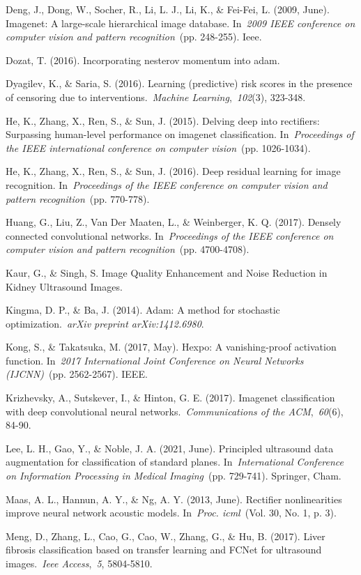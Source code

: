 \documentclass[
]{article}
\begin{document}
Deng, J., Dong, W., Socher, R., Li, L. J., Li, K., \& Fei-Fei, L. (2009,
June). Imagenet: A large-scale hierarchical image database.
In~\emph{2009 IEEE conference on computer vision and pattern
recognition}~(pp. 248-255). Ieee.

Dozat, T. (2016). Incorporating nesterov momentum into adam.

Dyagilev, K., \& Saria, S. (2016). Learning (predictive) risk scores in
the presence of censoring due to interventions.~\emph{Machine
Learning},~\emph{102}(3), 323-348.

He, K., Zhang, X., Ren, S., \& Sun, J. (2015). Delving deep into
rectifiers: Surpassing human-level performance on imagenet
classification. In~\emph{Proceedings of the IEEE international
conference on computer vision}~(pp. 1026-1034).

He, K., Zhang, X., Ren, S., \& Sun, J. (2016). Deep residual learning
for image recognition. In~\emph{Proceedings of the IEEE conference on
computer vision and pattern recognition}~(pp. 770-778).

Huang, G., Liu, Z., Van Der Maaten, L., \& Weinberger, K. Q. (2017).
Densely connected convolutional networks. In~\emph{Proceedings of the
IEEE conference on computer vision and pattern recognition}~(pp.
4700-4708).

Kaur, G., \& Singh, S. Image Quality Enhancement and Noise Reduction in
Kidney Ultrasound Images.

Kingma, D. P., \& Ba, J. (2014). Adam: A method for stochastic
optimization.~\emph{arXiv preprint arXiv:1412.6980}.

Kong, S., \& Takatsuka, M. (2017, May). Hexpo: A vanishing-proof
activation function. In~\emph{2017 International Joint Conference on
Neural Networks (IJCNN)}~(pp. 2562-2567). IEEE.

Krizhevsky, A., Sutskever, I., \& Hinton, G. E. (2017). Imagenet
classification with deep convolutional neural
networks.~\emph{Communications of the ACM},~\emph{60}(6), 84-90.

Lee, L. H., Gao, Y., \& Noble, J. A. (2021, June). Principled ultrasound
data augmentation for classification of standard planes.
In~\emph{International Conference on Information Processing in Medical
Imaging}~(pp. 729-741). Springer, Cham.

Maas, A. L., Hannun, A. Y., \& Ng, A. Y. (2013, June). Rectifier
nonlinearities improve neural network acoustic models. In~\emph{Proc.
icml}~(Vol. 30, No. 1, p. 3).

Meng, D., Zhang, L., Cao, G., Cao, W., Zhang, G., \& Hu, B. (2017).
Liver fibrosis classification based on transfer learning and FCNet for
ultrasound images.~\emph{Ieee Access},~\emph{5}, 5804-5810.
\end{document}
